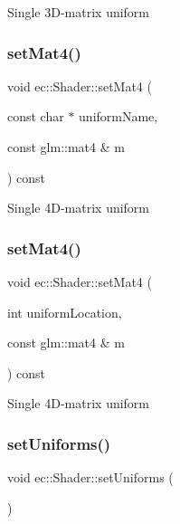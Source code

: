 Single 3\+D-\/matrix uniform \mbox{\label{classec_1_1_shader_a2aae545a7c6999a1e27d376e02be5fe4}} 
\subsubsection{\texorpdfstring{set\+Mat4()}{setMat4()}\hspace{0.1cm}{\footnotesize\ttfamily [1/2]}}
{\footnotesize\ttfamily void ec\+::\+Shader\+::set\+Mat4 (\begin{DoxyParamCaption}\item[{const char $\ast$}]{uniform\+Name,  }\item[{const glm\+::mat4 \&}]{m }\end{DoxyParamCaption}) const}

Single 4\+D-\/matrix uniform \mbox{\label{classec_1_1_shader_a70b14375c038b9814fe16b8e3ea92a13}} 
\subsubsection{\texorpdfstring{set\+Mat4()}{setMat4()}\hspace{0.1cm}{\footnotesize\ttfamily [2/2]}}
{\footnotesize\ttfamily void ec\+::\+Shader\+::set\+Mat4 (\begin{DoxyParamCaption}\item[{int}]{uniform\+Location,  }\item[{const glm\+::mat4 \&}]{m }\end{DoxyParamCaption}) const}

Single 4\+D-\/matrix uniform \mbox{\label{classec_1_1_shader_a2d674dadf35f9fba8d3ec75d0a916935}} 
\subsubsection{\texorpdfstring{set\+Uniforms()}{setUniforms()}}
{\footnotesize\ttfamily void ec\+::\+Shader\+::set\+Uniforms (\begin{DoxyParamCaption}{ }\end{DoxyParamCaption})\hspace{0.3cm}{\ttfamily [virtual]}}

